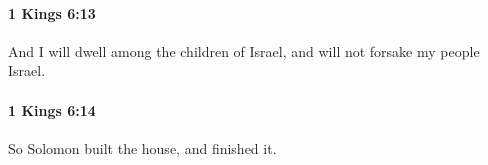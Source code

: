 		\paragraph{1 Kings 6:13} %
			\label{1KINGS-6-13}

			And I will dwell among the children of Israel, and will not forsake my people Israel.


		\paragraph{1 Kings 6:14} %
			\label{1KINGS-6-14}

			So Solomon built the house, and finished it.


